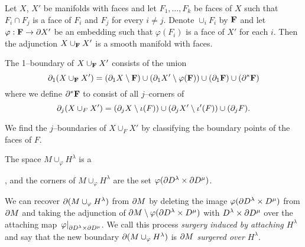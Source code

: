 \begin{cor}
	Let $X$, $X'$ be manifolds with faces and let $F_1,\dots, F_k$ be faces of $X$ such that $F_i\cap F_j$ is a face of $F_i$ and $F_j$ for every $i\neq j$.
	Denote $\cup_i F_i$ by ${\bf F}$ and let $\varphi:{\bf F}\to \partial X'$ be an embedding such that $\varphi(F_i)$ is a face of $X'$ for each $i$.
	Then the adjunction $X \cup_{\bf F} X'$ is a smooth manifold with faces.
	
	The 1--boundary of $X\cup_{\bf F} X'$ consists of the union
	$$\partial_1(X\cup_{\bf F}X')=(\partial_1 X\setminus {\bf F})\cup(\partial_1 X'\setminus \varphi({\bf F}))\cup(\partial_1 {\bf F})\cup(\partial^*{\bf F})$$
	where we define $\partial^*{\bf F}$ to consist of all $j$--corners of 
	$$\partial_j( X \cup_F X') = (\partial_j X\setminus \iota(F))\cup(\partial_j X'\setminus \iota'(F))\cup(\partial_j F).$$

	We find the $j$--boundaries of $X\cup_F X'$ by classifying the boundary points of the faces of $F$.
\end{cor}

The space $M\cup_\varphi H^\lambda$ is a 


, and the corners of $M\cup_\varphi H^\lambda$ are the set $\varphi(\partial D^\lambda\times\partial D^\mu)$.


\begin{defn}[Surgery]
	\label{def:surgery}
	We can recover $\partial (M\cup_\varphi H^\lambda)$ from $\partial M$ by deleting the image $\varphi(\partial D^\lambda\times D^\mu)$ from $\partial M$ and taking the adjunction of $\partial M\setminus \varphi(\partial D^\lambda\times D^\mu)$ with $D^\lambda\times\partial D^\mu$ over the attaching map $\left.\varphi\right|_{\partial D^\lambda\times\partial D^\mu}$.
	We call this process \emph{surgery induced by attaching $H^\lambda$} and say that the new boundary $\partial (M\cup_\varphi H^\lambda)$ is \emph{$\partial M$ surgered over $H^\lambda$}.
\end{defn}





















































